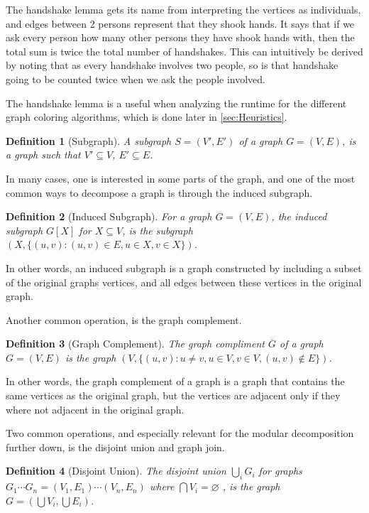 \documentclass[a4paper]{article}
\newtheorem{definition}{Definition}[section]
\begin{document}
The handshake lemma gets its name from interpreting the vertices as
individuals, and edges between 2 persons represent that they shook hands. It 
says that if we ask every person how many other persons they have shook
hands with, then the total sum is twice the total number of handshakes. This can
intuitively be derived by noting that as every handshake involves two people, so
is that handshake going to be counted twice when we ask the people involved.

The handshake lemma is a useful when analyzing the runtime for 
the different graph coloring algorithms, which is done later in
\autoref{sec:Heuristics}.


\begin{definition}[Subgraph]
    A subgraph $S = (V',E')$ of a graph $G = (V,E)$, is a graph such that
    $V' \subseteq V$, $E' \subseteq E$.
\end{definition}
In many cases, one is interested in some parts of the graph, and one of the
most common ways to decompose a graph is through the induced subgraph.
\begin{definition}[Induced Subgraph]
    For a graph $G = (V,E)$, the induced subgraph $G[X]$ for $X \subseteq V$, is
    the subgraph $(X,\{(u,v) : (u,v) \in E, u \in X,v \in X\})$. 
\end{definition}

In other words, an induced subgraph is a graph constructed by including a
subset of the original graphs vertices, and all edges between these vertices in
the original graph.

Another common operation, is the graph complement.
\begin{definition}[Graph Complement]
    The graph compliment $\overline{G}$ of a graph $G = (V,E)$ is the graph 
    $(V,\{ (u,v) : u \neq v, u \in V,v \in V, (u,v) \notin E \})$.
\end{definition}

In other words, the graph complement of a
graph is a graph that contains the same vertices as the original graph, but the
vertices are adjacent only if they where not adjacent in the original graph.

Two common operations, and especially relevant for the modular decomposition
further down, is the disjoint union and graph join.
\begin{definition}[Disjoint Union]
    The disjoint union $\bigcup_i G_i$ for graphs 
    $G_1 \cdots G_n = (V_1,E_1) \cdots (V_n,E_n)$ where 
    $\bigcap V_i = \varnothing $ , is the graph
    $G = \left( \bigcup V_i,\bigcup E_i \right)$.
\end{definition}
\end{document}
